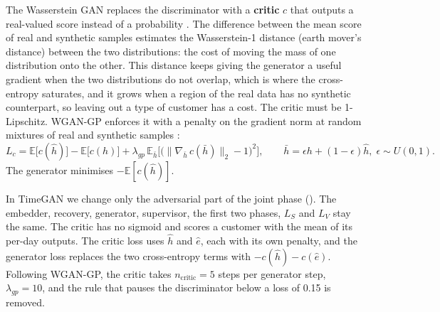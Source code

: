 \documentclass{article}
\newcommand{\E}{\mathbb{E}}
\begin{document}
The Wasserstein GAN replaces the discriminator with a \textbf{critic} $c$ that outputs a real-valued score instead of a probability \cite{arjovsky2017}. The difference between the mean score of real and synthetic samples estimates the Wasserstein-1 distance (earth mover's distance) between the two distributions: the cost of moving the mass of one distribution onto the other. This distance keeps giving the generator a useful gradient when the two distributions do not overlap, which is where the cross-entropy saturates, and it grows when a region of the real data has no synthetic counterpart, so leaving out a type of customer has a cost. The critic must be 1-Lipschitz. WGAN-GP enforces it with a penalty on the gradient norm at random mixtures of real and synthetic samples \cite{gulrajani2017}:
\begin{equation}
L_c = \E\big[c(\hat{h})\big] - \E\big[c(h)\big] + \lambda_{gp}\, \E_{\bar{h}}\Big[\big(\|\nabla_{\bar{h}}\, c(\bar{h})\|_2 - 1\big)^2\Big], \qquad \bar{h} = \epsilon h + (1-\epsilon)\hat{h}, \; \epsilon \sim U(0,1).
\end{equation}
The generator minimises $-\E[c(\hat{h})]$.

In TimeGAN we change only the adversarial part of the joint phase (). The embedder, recovery, generator, supervisor, the first two phases, $L_S$ and $L_V$ stay the same. The critic has no sigmoid and scores a customer with the mean of its per-day outputs. The critic loss uses $\hat{h}$ and $\hat{e}$, each with its own penalty, and the generator loss replaces the two cross-entropy terms with $-c(\hat{h}) - c(\hat{e})$. Following WGAN-GP, the critic takes $n_{\text{critic}} = 5$ steps per generator step, $\lambda_{gp} = 10$, and the rule that pauses the discriminator below a loss of 0.15 is removed.
\end{document}
